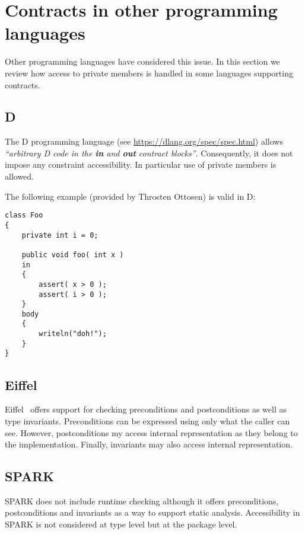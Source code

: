 \section{Contracts in other programming languages}

Other programming languages have considered this issue. 
In this section we review how access to private members is handled
in some languages supporting contracts.

\subsection{D}

The D programming language (see \url{https://dlang.org/spec/spec.html}) allows
\emph{``arbitrary D code in the \textbf{in} and \textbf{out} contract
blocks''}. Consequently, it does not impose any constraint accessibility. In
particular use of private members is allowed.

The following example (provided by Throsten Ottosen) is valid in D:

\begin{lstlisting}[morekeywords={in,body}]
class Foo
{
    private int i = 0;
    
    public void foo( int x ) 
    in
    {
        assert( x > 0 );
        assert( i > 0 );
    }
    body
    {
        writeln("doh!"); 
    }
}
\end{lstlisting}

\subsection{Eiffel}

Eiffel~\cite{iso-eiffel,ecma-eiffel} offers support for checking preconditions
and postconditions as well as type invariants. Preconditions can be expressed
using only what the caller can see. However, postconditions my access internal
representation as they belong to the implementation. Finally, invariants may
also access internal representation.

\subsection{SPARK}

SPARK does not include runtime checking although it offers preconditions,
postconditions and invariants as a way to support static analysis. Accessibility in
SPARK is not considered at type level but at the package level.


